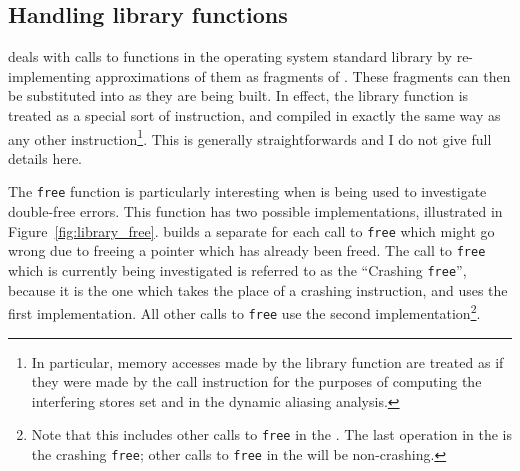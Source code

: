 \subsection{Handling library functions}
\label{sect:derive:library_functions}

{\Implementation} deals with calls to functions in the operating
system standard library by re-implementing approximations of them as
fragments of {\StateMachine}.  These fragments can then be substituted
into {\StateMachines} as they are being built.  In effect, the library
function is treated as a special sort of instruction, and compiled in
exactly the same way as any other instruction\footnote{In particular,
  memory accesses made by the library function are treated as if they
  were made by the call instruction for the purposes of computing the
  interfering stores set and in the dynamic aliasing analysis.}.  This
is generally straightforwards and I do not give full details here.

 The \texttt{free} function is particularly
interesting when {\technique} is being used to investigate double-free
errors.  This function has two possible implementations, illustrated
in Figure~\ref{fig:library_free}.  {\Technique} builds a separate
{\StateMachine} for each call to \texttt{free} which might go wrong
due to freeing a pointer which has already been freed.  The call to
\texttt{free} which is currently being investigated is referred to as
the ``Crashing \texttt{free}'', because it is the one which takes the
place of a crashing instruction, and uses the first implementation.
All other calls to \texttt{free} use the second
implementation\footnote{Note that this includes other calls to
  \texttt{free} in the .  The last operation
  in the  is the crashing \texttt{free};
  other calls to \texttt{free} in the  will
  be non-crashing.}.

